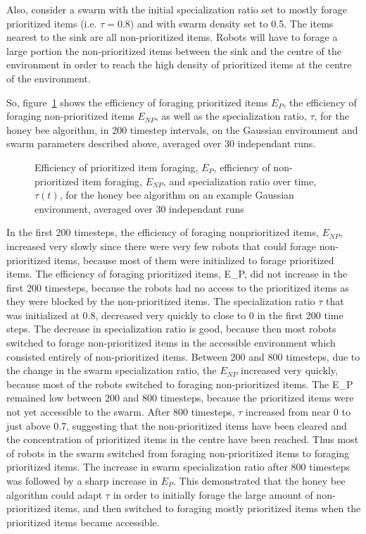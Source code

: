 Also, consider a swarm with the initial specialization ratio set to mostly forage prioritized items (i.e. $\tau=0.8$) and with swarm density set to 0.5. The items nearest to the sink are all non-prioritized items. Robots will have to forage a large portion the non-prioritized items between the sink and the centre of the environment in order to reach the high density of prioritized items at the centre of the environment. 


So, figure~\ref{fig:gaussianhighdensityperformancehoneybee} shows the efficiency of foraging prioritized items $E_P$, the efficiency of foraging non-prioritized items $E_{NP}$, as well as the specialization ratio, $\tau$, for the honey bee algorithm, in 200 timestep intervals, on the Gaussian environment and swarm parameters described above, averaged over 30 independant runs.


\begin{figure}[!htb]
\centering
\small
\resizebox{\textwidth}{!}{}
\caption{Efficiency of prioritized item foraging, $E_P$, efficiency of non-prioritized item foraging, $E_{NP}$, and specialization ratio over time, $\tau(t)$, for the honey bee algorithm on an example Gaussian environment, averaged over 30 independant runs}
\label{fig:gaussianhighdensityperformancehoneybee}
\end{figure}

In the first 200 timesteps, the efficiency of foraging nonprioritized items, $E_{NP}$, increased very slowly since there were very few robots that could forage non-prioritized items, because most of them were initialized to forage prioritized items. The efficiency of foraging prioritized items, E_{P}, did not increase in the first 200 timesteps, because the robots had no access to the prioritized items as they were blocked by the non-prioritized items. The specialization ratio $\tau$ that was initialized at 0.8, decreased very quickly to close to 0 in the first 200 time steps. The decrease in specialization ratio is good, because then most robots switched to forage non-prioritized items in the accessible environment which consisted entirely of non-prioritized items. Between 200 and 800 timesteps, due to the change in the swarm specialization ratio, the $E_{NP}$ increased very quickly, because most of the robots switched to foraging non-prioritized items. The E_{P} remained low between 200 and 800 timesteps, because the prioritized items were not yet accessible to the swarm. After 800 timesteps, $\tau$ increased from near 0 to just above 0.7, suggesting that the non-prioritized items have been cleared and the concentration of prioritized items in the centre have been reached. Thus most of robots in the swarm switched from foraging non-prioritized items to foraging prioritized items. The increase in swarm specialization ratio after 800 timesteps was followed by a sharp increase in $E_P$. This demonstrated that the honey bee algorithm could adapt $\tau$ in order to initially forage the large amount of non-prioritized items, and then switched to foraging mostly prioritized items when the prioritized items became accessible.

